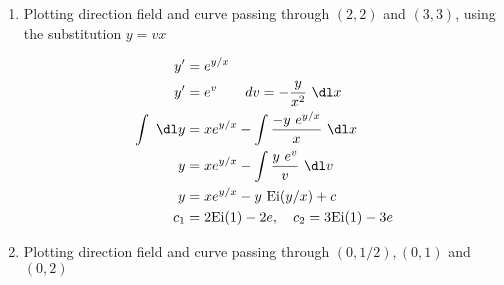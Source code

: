 \begin{enumerate}
    \item Plotting direction field and curve passing through $(2, 2)$ and $(3, 3)$,
          using the substitution $y = vx$

          \begin{align}
              y'            & = e^{y/x}                                         \\
              y'            & = e^{v} \qquad
              dv = -\frac{y}{x^{2}} \ \dl x                                     \\
              \int  \ \dl y & = x e^{y/x} - \int \frac{-y\ e^{y/x}}{x}  \ \dl x \\
              y             & = x e^{y/x} - \int \frac{y\ e^{v}}{v}  \ \dl v    \\
              y             & = x e^{y/x} - y\ \mathrm{Ei}(y/x) + c             \\
              c_{1}         & = 2 \mathrm{Ei}(1) - 2e, \quad c_{2}
              = 3 \mathrm{Ei}(1) - 3e
          \end{align}

          \begin{figure}[H]
              \centering
          \end{figure}

    \item Plotting direction field and curve passing through $(0, 1/2), (0, 1)$
          and $(0, 2)$


\end{enumerate}
